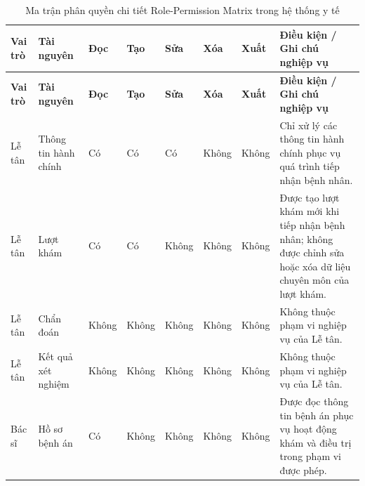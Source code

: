 \begin{landscape}

\begingroup
\small
\setlength{\tabcolsep}{3pt}
\renewcommand{\arraystretch}{1.15}
\setlength\LTleft{0pt}
\setlength\LTright{0pt}

\begin{longtable}{|
>{\raggedright\arraybackslash}p{2.3cm} |
>{\raggedright\arraybackslash}p{2.8cm} |
>{\centering\arraybackslash}p{1.1cm} |
>{\centering\arraybackslash}p{1.1cm} |
>{\centering\arraybackslash}p{1.1cm} |
>{\centering\arraybackslash}p{1.1cm} |
>{\centering\arraybackslash}p{1.2cm} |
>{\raggedright\arraybackslash}p{8.0cm} |
}

\caption{Ma trận phân quyền chi tiết Role-Permission Matrix trong hệ thống y tế}
\label{tab:rbac_granular_matrix} \\

\hline
\textbf{Vai trò} &
\textbf{Tài nguyên} &
\textbf{Đọc} &
\textbf{Tạo} &
\textbf{Sửa} &
\textbf{Xóa} &
\textbf{Xuất} &
\textbf{Điều kiện / Ghi chú nghiệp vụ} \\
\hline
\endfirsthead

\hline
\textbf{Vai trò} &
\textbf{Tài nguyên} &
\textbf{Đọc} &
\textbf{Tạo} &
\textbf{Sửa} &
\textbf{Xóa} &
\textbf{Xuất} &
\textbf{Điều kiện / Ghi chú nghiệp vụ} \\
\hline
\endhead

\hline
\endfoot


Lễ tân &
Thông tin hành chính &
Có & Có & Có & Không & Không &
Chỉ xử lý các thông tin hành chính phục vụ quá trình tiếp nhận bệnh nhân. \\
\hline

Lễ tân &
Lượt khám &
Có & Có & Không & Không & Không &
Được tạo lượt khám mới khi tiếp nhận bệnh nhân; không được chỉnh sửa hoặc xóa dữ liệu chuyên môn của lượt khám. \\
\hline

Lễ tân &
Chẩn đoán &
Không & Không & Không & Không & Không &
Không thuộc phạm vi nghiệp vụ của Lễ tân. \\
\hline

Lễ tân &
Kết quả xét nghiệm &
Không & Không & Không & Không & Không &
Không thuộc phạm vi nghiệp vụ của Lễ tân. \\
\hline



Bác sĩ &
Hồ sơ bệnh án &
Có & Không & Không & Không & Không &
Được đọc thông tin bệnh án phục vụ hoạt động khám và điều trị trong phạm vi được phép. \\
\hline


\end{longtable}
\end{landscape}

